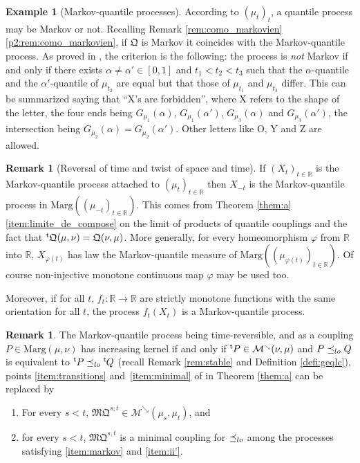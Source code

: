 \documentclass[11pt]{article}
\renewcommand{\theenumi}{\alph{enumi}}
\renewcommand{\theenumii}{\roman{enumii}}
\newenvironment{enumeratei}
{\bgroup\def\theenumi{\roman{enumi}}\def\theenumii{\arabic{enumii}}\begin{enumerate}}
{\end{enumerate}\egroup}
\theoremstyle{plain}
\theoremstyle{definition}
\newtheorem{rem}[them]{Remark}
\newtheorem{ex}[them]{Example}
\newcommand{\como}{\mathfrak{Q}}
\newcommand{\mq}{\mathfrak{MQ}}
\newcommand{\trans}{{}^{\mathrm{t}}\mkern-1mu}
\newcommand{\ma}{\mathrm{Marg}}
\newcommand{\R}{\mathbb{R}}
\newcommand{\mdec}{\mathcal{M}^{\scriptscriptstyle\searrow}}
\newcommand{\leqlc}{\preceq_{\rm lo}}
\begin{document}
\begin{ex}[Markov-quantile processes]\label{ex:quantile}
According to $(\mu_t)_t$, a quantile process may be Markov or not. Recalling Remark \ref{rem:como_markovien} \eqref{p2:rem:como_markovien}, if $\como$ is Markov it coincides with the Markov-quantile process. As proved in \cite[Prop.\,3]{Ju_seminaire}, the criterion is the following: the process is \emph{not} Markov if and only if there exists $\alpha\neq \alpha'\in [0,1]$ and $t_1<t_2<t_3$ such that the $\alpha$-quantile and the $\alpha'$-quantile of $\mu_{t_2}$ are equal but that those of $\mu_{t_1}$ and $\mu_{t_3}$ differ. This can be summarized saying that ``X's are forbidden'', where X refers to the shape of the letter, the four ends being $G_{\mu_1}(\alpha)$, $G_{\mu_1}(\alpha')$, $G_{\mu_3}(\alpha)$ and $G_{\mu_3}(\alpha')$, the intersection being $G_{\mu_2}(\alpha)=G_{\mu_2}(\alpha')$. Other letters like O, Y and Z are allowed.
\end{ex}

\begin{rem}[Reversal of time and twist of space and time]\label{ex:reversed}
If $(X_t)_{t\in \R}$ is the Markov-quantile process attached to $(\mu_t)_{t\in\R}$ then $X_{-t}$ is the Markov-quantile process in $\ma((\mu_{-t})_{t\in \R})$. This comes from Theorem \ref{them:a} \eqref{item:limite_de_compose} on the limit of products of quantile couplings and the fact that $\trans \como(\mu,\nu)=\como(\nu,\mu)$. More generally, for every homeomorphism $\varphi$ from $\R$ into $\R$, $X_{\varphi(t)}$ has law the Markov-quantile measure of $\ma((\mu_{\varphi(t)})_{t\in \R})$. Of course non-injective monotone continuous map $\varphi$ may be used too.

Moreover, if for all $t$, $f_t:\R\to \R$ are strictly monotone functions with the same orientation for all $t$, the process $f_t(X_t)$ is a Markov-quantile process.
\end{rem}

\begin{rem}
The Markov-quantile process being time-reversible, and as a coupling $P\in \ma(\mu,\nu)$ has increasing kernel if and only if $\trans P\in\mdec(\nu,\mu)$ and $P \leqlc Q$ is equivalent to $\trans P\leqlc \trans Q$ (recall Remark \ref{rem:stable} and Definition \ref{defi:geqlc}), points \eqref{item:transitions} and~\eqref{item:minimal} of in Theorem \ref{them:a} can be replaced by
\begin{enumeratei}\renewcommand{\theenumi}{\roman{enumi}'}
\item\label{item:ii'}
For every $s<t$, $\mq^{s,t}\in\mdec(\mu_s,\mu_t)$, and
\item\label{item:iii'}
for every $s<t$, $\mq^{s,t}$ is a minimal coupling for $\leqlc$ among the processes satisfying \eqref{item:markov} and \eqref{item:ii'}.
\end{enumeratei}
\end{rem}
\end{document}
